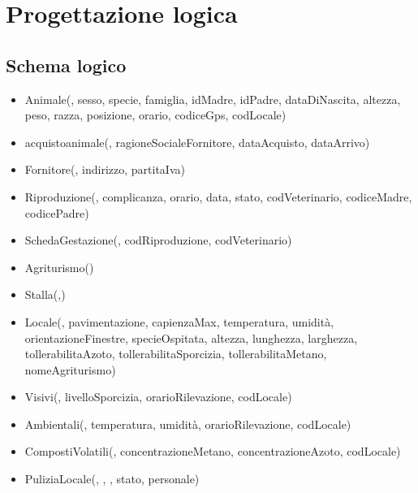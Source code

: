 \documentclass[12pt,a4paper]{article}
\begin{document}
\section{Progettazione logica}

\subsection{Schema logico}

\begin{itemize}

\item Animale(\underline{}, sesso, specie, famiglia, idMadre, idPadre, dataDiNascita, altezza, peso, razza, posizione, orario,  codiceGps,  codLocale)
\item acquistoanimale(\underline{}, ragioneSocialeFornitore,  dataAcquisto,  dataArrivo)
\item Fornitore(\underline{}, indirizzo, partitaIva)
\item Riproduzione(\underline{}, complicanza, orario, data, stato,  codVeterinario, codiceMadre, codicePadre)
\item SchedaGestazione(\underline{},  codRiproduzione,  codVeterinario)
\item Agriturismo(\underline{})
\item Stalla(\underline{},\underline{})
\item Locale(\underline{}, pavimentazione, capienzaMax, temperatura, umidità, orientazioneFinestre, specieOspitata, altezza, lunghezza, larghezza, tollerabilitaAzoto, tollerabilitaSporcizia, tollerabilitaMetano, nomeAgriturismo)
\item Visivi(\underline{}, livelloSporcizia,  orarioRilevazione,  codLocale)
\item Ambientali(\underline{}, temperatura, umidità,  orarioRilevazione,  codLocale)
\item CompostiVolatili(\underline{}, concentrazioneMetano, concentrazioneAzoto,  codLocale)
\item PuliziaLocale(\underline{}, \underline{}, \underline{}, stato, personale)

\end{itemize}
\end{document}

